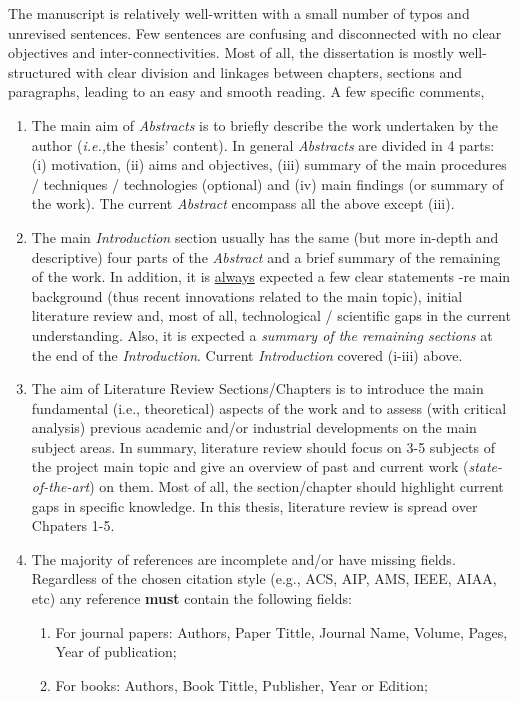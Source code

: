 \documentclass[14pt,twoside]{report}
\newcommand{\ie}{{\it i.e.,}}
\begin{document}
The manuscript is relatively well-written with a small number of typos and unrevised sentences. Few sentences are confusing and disconnected with no clear objectives and inter-connectivities. Most of all, the dissertation is mostly well-structured with clear division and linkages between chapters, sections and paragraphs, leading to an easy and smooth reading. A few specific comments,
\begin{enumerate}
%
\item The main aim of {\it Abstracts} is to briefly describe the work undertaken by the author (\ie the thesis' content). In general {\it Abstracts} are divided in 4 parts: (i) motivation, (ii) aims and objectives, (iii) summary of the main procedures / techniques / technologies (optional) and (iv) main findings (or summary of the work). The current {\it Abstract} encompass all the above except (iii).
%
\item The main {\it Introduction} section usually has the same (but more in-depth and descriptive) four parts of the {\it Abstract} and a brief summary of the remaining of the work. In addition, it is \underline{always} expected a few clear statements -re main background (thus recent innovations related to the main topic), initial literature review and, most of all, technological / scientific gaps in the current understanding. Also, it is expected a {\it summary of the remaining sections} at the end of the {\it Introduction}.  Current {\it Introduction} covered (i-iii) above.
%
\item The aim of Literature Review Sections/Chapters is to introduce the main fundamental (i.e., theoretical) aspects of the work and to assess (with critical analysis) previous academic and/or industrial developments on the main subject areas. In summary, literature review should focus on 3-5 subjects of the project main topic and give an overview of past and current work ({\it state-of-the-art}) on them. Most of all, the section/chapter should highlight current gaps in specific knowledge. In this thesis, literature review is spread over Chpaters 1-5.
%
\item The majority of references are incomplete and/or have missing fields. Regardless of the chosen citation style (e.g., ACS, AIP, AMS, IEEE, AIAA, etc) any reference {\bf must} contain the following fields: 
\begin{enumerate}
\item For journal papers: Authors, Paper Tittle, Journal Name, Volume, Pages, Year of publication;
\item For books: Authors, Book Tittle, Publisher, Year or Edition;

\end{enumerate}
\end{enumerate}
\end{document}
